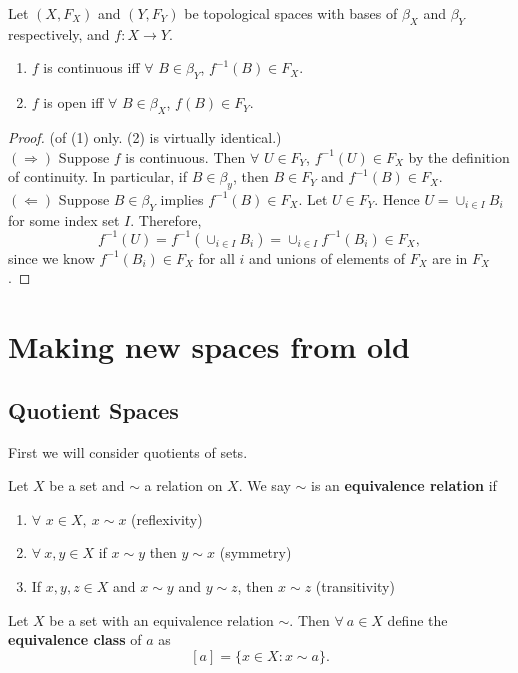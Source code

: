 \begin{smallfact} 
Let $(X, F_X)$ and $(Y, F_Y)$ be topological spaces with bases of $\beta_X$ and $\beta_Y$ respectively, and $f: X \to Y$. 
\begin{enumerate}
	\item $f$ is continuous iff $\forall$ $B \in \beta_Y$, $f^{-1}(B) \in F_X$. 
	\item $f$ is open iff $\forall$ $B \in \beta_X$, $f(B) \in F_Y$.
\end{enumerate}
\end{smallfact}
\begin{proof}
(of (1) only. (2) is virtually identical.)\\
$(\Rightarrow)$ Suppose $f$ is continuous. Then $\forall$ $U \in F_Y$, $f^{-1}(U) \in F_X$ by the definition of continuity. In particular, if $B \in \beta_y$, then $B \in F_Y$ and $f^{-1}(B) \in F_X$. \\
$(\Leftarrow)$ Suppose $B \in \beta_Y$ implies $f^{-1}(B) \in F_X$. Let $U \in F_Y$. Hence $U = \cup_{i \in I} B_i$ for some index set $I$. Therefore,
$$f^{-1}(U) = f^{-1}(\cup_{i \in I} B_i) = \cup_{i \in I} f^{-1}(B_i) \in F_X,$$ 
since we know $f^{-1}(B_i) \in F_X$ for all $i$ and unions of elements of $F_X$ are in $F_X$. 
\end{proof}

\chapter{Making new spaces from old}
\section{Quotient Spaces}

First we will consider quotients of sets.
\begin{definition}
Let $X$ be a set and $\sim$ a relation on $X$. We say $\sim$ is an {\bf equivalence relation} if 
\begin{enumerate}
	\item $\forall$ $x \in X, \ x\sim x$ (reflexivity)
	\item $\forall \ x, y \in X$ if $x\sim y$ then $y\sim x$ (symmetry)
	\item If $x, y, z \in X$ and $x\sim y$ and $y\sim z$, then $x\sim z$ (transitivity)
\end{enumerate}
\end{definition}

\begin{definition}
Let $X$ be a set with an equivalence relation $\sim$. Then $\forall \ a \in X$ define the {\bf equivalence class} of $a$ as 
\[[a] = \{x \in X : x\sim a \}.\]
\end{definition}

